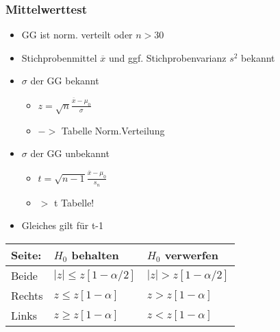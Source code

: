 \documentclass[a4paper]{article}
\begin{document}
\begin{landscape}
\begin{multicols}{4}
        \subsubsection*{Mittelwerttest}
        \begin{itemize}[noitemsep,nolistsep,leftmargin=*]
            \item GG ist norm. verteilt oder $n > 30$
            \item Stichprobenmittel $\overline{x}$ und ggf. Stichprobenvarianz $s^2$ bekannt
            \item $\sigma$ der GG bekannt
            \begin{itemize}[noitemsep,nolistsep,leftmargin=*]
                \item $z = \sqrt{n}\frac{\overline{x}-\mu_0}{\sigma}$
                \item $->$ Tabelle Norm.Verteilung
            \end{itemize}
            \item $\sigma$ der GG unbekannt
            \begin{itemize}[noitemsep,nolistsep,leftmargin=*]
                \item $t = \sqrt{n-1}\frac{\overline{x}-\mu_0}{s_n}$
                \item $>$ t Tabelle!
            \end{itemize}
            \item Gleiches gilt für t-1
        \end{itemize}
        \begin{center}
            \begin{tabular}{|l|l|l|}
             Seite:& $H_0$ behalten & $H_0$ verwerfen  \\ \hline
             Beide & $|z|  \leq z[1-\alpha/2]$  & $|z| > z[1-\alpha/2]$  \\ \hline
             Rechts& $z  \leq z[1-\alpha]$ &  $z > z[1-\alpha]$ \\ \hline
             Links & $z  \geq z[1-\alpha]$  &  $z < z[1-\alpha]$ \\ \hline
            \end{tabular}
        \end{center}





\end{multicols}
\end{landscape}
\end{document}
